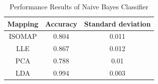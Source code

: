 
\begin{table}[h!]
\caption{Performance Results of Naive Bayes Classifier}
\label{table:1}
\centering
 \begin{tabular}{||c c c||} 
 \hline
 Mapping & Accuracy & Standard deviation \\ [0.5ex] 
 \hline\hline
 ISOMAP & 0.804 & 0.011 \\ 
 \hline
 LLE & 0.867 & 0.012 \\
 \hline
 PCA & 0.788 & 0.01 \\
 \hline
 LDA & 0.994 & 0.003 \\ [1ex] 
 \hline
\end{tabular}
\end{table}
